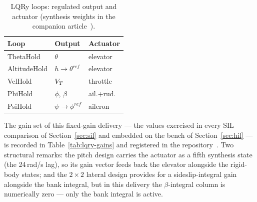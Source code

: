 \begin{table}[!t]
\caption{LQRy loops: regulated output and actuator (synthesis weights
in the companion article~\cite{mirko2026companion}).}
\label{tab:lqry-loops}
\centering
\begin{tabular}{lll}
\toprule
Loop & Output & Actuator \\
\midrule
ThetaHold & $\theta$ & elevator \\
AltitudeHold & $h\!\to\!\theta^{ref}$ & elevator \\
VelHold & $V_T$ & throttle \\
PhiHold & $\phi$, $\beta$ & ail.+rud. \\
PsiHold & $\psi\!\to\!\phi^{ref}$ & aileron \\
\bottomrule
\end{tabular}
\end{table}

The gain set of this fixed-gain delivery --- the values exercised in
every SIL comparison of Section~\ref{sec:sil} and embedded on the
bench of Section~\ref{sec:hil} --- is recorded in
Table~\ref{tab:lqry-gains} and registered in the
repository~\cite{repo}. Two structural remarks: the pitch design
carries the actuator as a fifth synthesis state (the 24\,rad/s lag),
so its gain vector feeds back the elevator alongside the rigid-body
states; and the $2\times2$ lateral design provides for a
sideslip-integral gain alongside the bank integral, but in this
delivery the $\beta$-integral column is numerically zero --- only the
bank integral is active.

\begin{table}[!t]
\caption{Gains of the fixed-gain LQRy delivery (4 significant
digits). Convention: $\Delta u=G_{x}\,(x-x^{e})+K_{I}\!\int\!e\,dt$,
the increments adding to the trim commands of~\eqref{eq:dtrim}. The
$K_I$ entries of PhiHold are the bank ($\phi$) integral gains.}
\label{tab:lqry-gains}
\centering
{}
\end{table}

